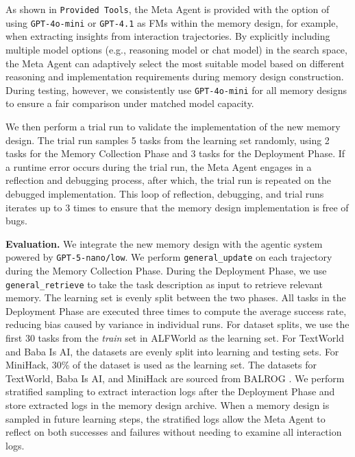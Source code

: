 \documentclass{article}
\theoremstyle{plain}
\theoremstyle{definition}
\theoremstyle{remark}
\begin{document}
As shown in \texttt{Provided Tools}, the Meta Agent is provided with the option of using 
\texttt{GPT-4o-mini} or \texttt{GPT-4.1} as FMs within the memory design, 
for example, when extracting insights from interaction trajectories. By explicitly including multiple model options (e.g., reasoning model or chat model) in the search space, 
the Meta Agent can adaptively select the most suitable model based on different reasoning 
and implementation requirements during memory design construction.
During testing, however, we consistently use \texttt{GPT-4o-mini} for all memory designs 
to ensure a fair comparison under matched model capacity.

We then perform a trial run to validate the implementation of the new memory design. 
The trial run samples 5 tasks from the learning set randomly, using 2 tasks for the 
Memory Collection Phase and 3 tasks for the Deployment Phase. If a runtime error occurs 
during the trial run, the Meta Agent engages in a reflection and debugging process, 
after which, the trial run is repeated on the debugged implementation. 
This loop of reflection, debugging, and trial runs iterates up to 3 times to ensure 
that the memory design implementation is free of bugs.

\noindent\textbf{Evaluation.}\hspace{0.5em} 
We integrate the new memory design with the agentic system powered by \texttt{GPT-5-nano/low}. We perform 
\texttt{general\_update} on each trajectory during the Memory Collection Phase. 
During the Deployment Phase, we use \texttt{general\_retrieve} to take the task 
description as input to retrieve relevant memory. 
The learning set is evenly split between the two phases. 
All tasks in the Deployment Phase are executed three times to compute the average 
success rate, reducing bias caused by variance in individual runs. For dataset splits, we use the first 30 tasks from the \textit{train} set in ALFWorld as the learning set. 
For TextWorld and Baba Is AI, the datasets are evenly split into learning and testing sets. 
For MiniHack, 30\% of the dataset is used as the learning set. 
The datasets for TextWorld, Baba Is AI, and MiniHack are sourced from BALROG \citep{balrog}.
We perform stratified sampling \citep{thompson2012sampling} to extract interaction logs after the Deployment Phase and store extracted logs in the memory design archive. 
When a memory design is sampled in future learning steps, the stratified logs allow the Meta Agent to reflect on both successes and failures 
without needing to examine all interaction logs.
\end{document}
